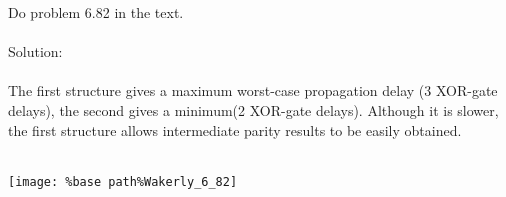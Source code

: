 Do problem 6.82 in the text.\\ \\

Solution: \\ \\
The first structure gives a maximum worst-case propagation delay (3 XOR-gate delays), the second gives a minimum(2 XOR-gate delays).  Although it is slower, the first structure allows intermediate parity results to be easily obtained.\\ \\
\begin{center}
  \texttt{[image: \%base path\%Wakerly\_6\_82]} \\
\end{center}
